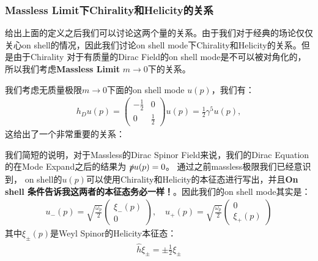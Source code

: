 \subsubsection{Massless Limit下Chirality和Helicity的关系}

给出上面的定义之后我们可以讨论这两个量的关系。由于我们对于经典的场论仅仅关心on shell的情况，因此我们讨论on shell
mode下Chirality和Helicity的关系。但是由于Chirality 对于有质量的Dirac Field的on shell
mode是不可以被对角化的，所以我们考虑\textbf{Massless Limit} $ m\rightarrow 0 $下的关系。

\bigskip
{}

我们考虑无质量极限$ m\rightarrow 0 $下面的on shell mode $ u(p) $，我们有：
\begin{align}
  h_D u(p) =
  \begin{pmatrix}-\frac{1}{2}&0\\0&\frac{1}{2}
  \end{pmatrix}u(p)=\frac{1}{2}\gamma^5u(p),
\end{align}
这给出了一个非常重要的关系：

\bigskip
{}

我们简短的说明，对于Massless的Dirac Spinor Field来说，我们的Dirac Equation的在Mode
Expand之后的结果为 $  \slashed{p}u(p)=0  $。
通过之前massless极限我们已经意识到， on shell的$ u(p)
$可以使用Chirality和Helicity的本征态进行写出，并且\textbf{On shell
条件告诉我这两者的本征态务必一样！}。因此我们的on shell mode其实是：
\begin{align}
  u_-(p)=\sqrt{\frac{\omega_p}{2}}
  \begin{pmatrix}\xi_-(p)\\0
  \end{pmatrix},\quad u_+(p)=\sqrt{\frac{\omega_p}{2}}
  \begin{pmatrix}0\\\xi_+(p)
  \end{pmatrix}
\end{align}
其中$ \xi_\pm(p) $是Weyl Spinor的Helicity本征态：
\begin{align}
  \hat{h}\xi_\pm=\pm\frac{1}{2}\xi_\pm
\end{align}
